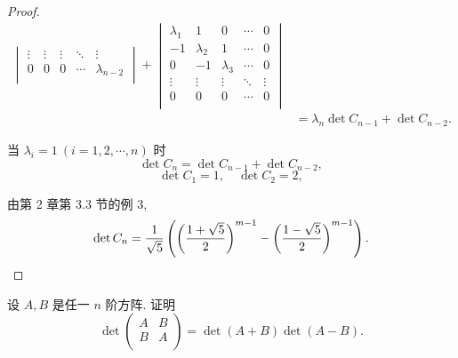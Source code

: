 \documentclass[color=black,device=normal,lang=cn,mode=geye]{elegantnote}
\begin{document}
\begin{landscape}
\begin{proof}
\begin{align*}
\begin{vmatrix}
            \vdots & \vdots & \vdots & \ddots & \vdots \\
            0 & 0 & 0 & \cdots & \lambda_{n-2} \\
        \end{vmatrix}+\begin{vmatrix}
            \lambda_1 & 1 & 0 & \cdots & 0 \\
            -1 & \lambda_2 & 1 & \cdots & 0 \\
            0 & -1 & \lambda_3 & \cdots & 0 \\
            \vdots & \vdots & \vdots & \ddots & \vdots \\
            0 & 0 & 0 & \cdots & 0 \\
        \end{vmatrix} \\
            & =\lambda_n\det C_{n-1}+\det C_{n-2}.
        \end{align*}
    
        当 $\lambda_i=1\ (i=1,2,\cdots,n)$ 时
        \[\det C_n=\det C_{n-1}+\det C_{n-2},\]
        \[\det C_1=1,\quad\det C_2=2,\]
    
        由第 2 章第 3.3 节的例 3,
        \[\det C_n=\dfrac{1}{\sqrt{5}}\left(\left(\dfrac{1+\sqrt{5}}{2}\right)^{m-1}-\left(\dfrac{1-\sqrt{5}}{2}\right)^{m-1}\right).\qedhere\]
    \end{proof}
\end{landscape}
\begin{exercise}%
    设 $A,B$ 是任一 $n$ 阶方阵. 证明
    \[\det\begin{pmatrix}
        A & B \\
        B & A \\
    \end{pmatrix}=\det(A+B)\det(A-B).\]
\end{exercise}
\end{document}
